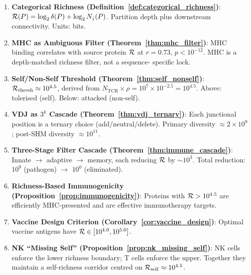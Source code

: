 \begin{chapterbox}[title=Chapter 23 --- Key Results Established]
\begin{enumerate}[label=\textbf{\arabic*.}]
  \item \textbf{Categorical Richness (Definition~\ref{def:categorical_richness})}:
        $\mathcal{R}(P) = \log_2 \delta(P) + \log_2 N_{\downarrow}(P)$.
        Partition depth plus downstream connectivity. Units: bits.

  \item \textbf{MHC as Ambiguous Filter (Theorem~\ref{thm:mhc_filter})}:
        MHC binding correlates with source protein $\mathcal{R}$ at $r = 0.73$,
        $p < 10^{-12}$. MHC is a depth-matched richness filter, not a sequence-
        specific lock.

  \item \textbf{Self/Non-Self Threshold (Theorem~\ref{thm:self_nonself})}:
        $\mathcal{R}_{\mathrm{thresh}} \approx 10^{4.5}$, derived from
        $N_{\mathrm{TCR}} \times \rho = 10^7 \times 10^{-2.5} = 10^{4.5}$.
        Above: tolerised (self). Below: attacked (non-self).

  \item \textbf{VDJ as $3^k$ Cascade (Theorem~\ref{thm:vdj_ternary})}:
        Each junctional position is a ternary choice (add/neutral/delete).
        Primary diversity $\approx 2 \times 10^9$; post-SHM diversity
        $\approx 10^{11}$.

  \item \textbf{Three-Stage Filter Cascade (Theorem~\ref{thm:immune_cascade})}:
        Innate $\to$ adaptive $\to$ memory, each reducing $\mathcal{R}$ by
        $\sim 10^3$. Total reduction: $10^9$ (pathogen) $\to$ $10^0$ (eliminated).

  \item \textbf{Richness-Based Immunogenicity (Proposition~\ref{prop:immunogenicity})}:
        Proteins with $\mathcal{R} > 10^{4.5}$ are efficiently MHC-presented and are
        effective immunotherapy targets.

  \item \textbf{Vaccine Design Criterion (Corollary~\ref{cor:vaccine_design})}:
        Optimal vaccine antigens have $\mathcal{R} \in [10^{4.0}, 10^{5.0}]$.

  \item \textbf{NK ``Missing Self'' (Proposition~\ref{prop:nk_missing_self})}:
        NK cells enforce the lower richness boundary; T cells enforce the upper.
        Together they maintain a self-richness corridor
        centred on $\mathcal{R}_{\mathrm{self}} \approx 10^{4.5}$.
\end{enumerate}
\end{chapterbox}
